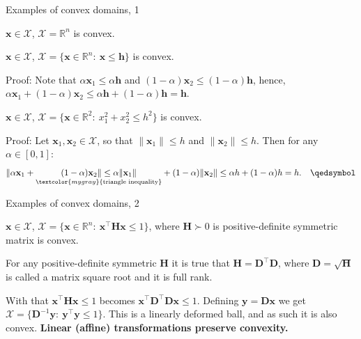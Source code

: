 \documentclass{beamer}
\begin{document}
\begin{frame}{Examples of convex domains, 1}
	\begin{flushleft}
		
		$\mathbf{x} \in \mathcal{X}$, $\mathcal{X} = \mathbb{R}^n$  is convex.
		
		\bigskip
		
		$\mathbf{x} \in \mathcal{X}$, $\mathcal{X} = \{ \mathbf{x} \in \mathbb{R}^n: \ \mathbf{x} \leq \mathbf{h} \}$ is convex.
		
		\bigskip
		
		Proof: Note that $\alpha \mathbf{x}_1 \leq \alpha \mathbf{h}$ and $(1 - \alpha) \mathbf{x}_2 \leq (1 - \alpha) \mathbf{h}$, hence, $\alpha \mathbf{x}_1 + (1 - \alpha) \mathbf{x}_2 \leq 
		\alpha \mathbf{h} + (1 - \alpha) \mathbf{h} = \mathbf{h}$. \qedsymbol
		
		\bigskip
		
		$\mathbf{x} \in \mathcal{X}$, $\mathcal{X} = \{ \mathbf{x} \in \mathbb{R}^2: \ x_1^2+x_2^2 \leq h^2 \}$ is convex.
		
		\bigskip
		
		Proof: Let $\mathbf{x}_1, \mathbf{x}_2 \in \mathcal{X}$, so that 
		$\|\mathbf{x}_1\| \le h$ and $\|\mathbf{x}_2\| \le h$. Then for any $\alpha \in [0,1]$:
		\[  
		\|\alpha \mathbf{x}_1 + 
		\underset{\textcolor{mygray}{\text{triangle inequality}}}{(1-\alpha)\mathbf{x}_2\| \le \alpha \|\mathbf{x}_1\| }
		+ (1-\alpha)\|\mathbf{x}_2\|
		\le \alpha h + (1-\alpha)h = h. \ \ \  \qedsymbol
		\] 
		
		
	\end{flushleft}
\end{frame}






\begin{frame}{Examples of convex domains, 2}
	\begin{flushleft}
		
		$\mathbf{x} \in \mathcal{X}$, $\mathcal{X} = \{ \mathbf{x} \in \mathbb{R}^n: \ \mathbf{x}^\top \mathbf{H} \mathbf{x} \leq 1 \}$, where $\mathbf{H} \succ 0$ is positive-definite symmetric matrix is convex. 
		
		\bigskip
		
		For any positive-definite symmetric $\mathbf{H}$ it is true that $\mathbf{H} = \mathbf{D}^\top\mathbf{D}$, where $\mathbf{D} = \sqrt{\mathbf{H}}$ is called a matrix square root and it is full rank. 
		
		\bigskip
		
		With that $\mathbf{x}^\top \mathbf{H} \mathbf{x} \leq 1$ becomes $\mathbf{x}^\top \mathbf{D}^\top\mathbf{D} \mathbf{x} \leq 1$. Defining $\mathbf{y} = \mathbf{D} \mathbf{x}$ we get $\mathcal{X} = \{ \mathbf{D}^{-1}\mathbf{y}: \ \mathbf{y}^\top \mathbf{y} \leq 1 \}$. This is a linearly deformed ball, and as such it is also convex. \textbf{Linear (affine) transformations preserve convexity.}
		
	\end{flushleft}
\end{frame}
\end{document}

